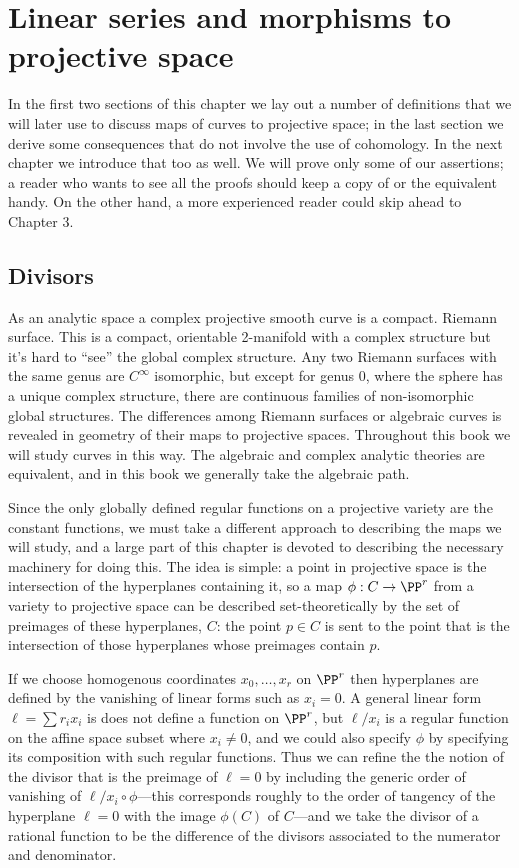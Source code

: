 

\chapter{Linear series and morphisms to projective space}\label{linear series}

In the first two sections of this chapter we lay out a number of definitions that we will later use to discuss
maps of curves to projective space; in the last section we derive some consequences that do not involve the
use of cohomology. In the next chapter we introduce that too as well. We will prove only some of our assertions; a reader who wants to see all the proofs should keep a copy of \cite{Hartshorne1977} or the equivalent handy. On the other hand, a more experienced reader
could skip ahead to Chapter 3.

\section{Divisors}

As an analytic space a complex projective smooth curve is a compact. Riemann surface. This is a compact, orientable 2-manifold with a complex structure but it's hard to ``see'' the global complex structure. Any two Riemann surfaces with the same genus are $C^\infty$ isomorphic, but except for genus 0, where the sphere has a unique complex structure,
there are continuous families of non-isomorphic global structures.  The differences among Riemann surfaces or algebraic curves is revealed in  geometry of their maps to projective spaces. Throughout this book we will study curves in this way. The algebraic and
complex analytic theories are equivalent, and in this book we generally take the algebraic path.

Since the only  globally defined regular functions on a projective variety are the constant functions, we must take a different approach to describing the maps we will study, and a large part of this chapter is devoted to describing the necessary machinery for doing this. The idea is simple: a point in projective space is the intersection of the hyperplanes containing it, so a map $\phi: C\to \PP^r$ from a variety to projective space can be described set-theoretically
by the set of preimages of these hyperplanes, $C$: the point $p\in C$ is sent to the point
that is the intersection of those hyperplanes whose preimages contain $p$. 

If we choose homogenous coordinates $x_0,\dots, x_r$ on $\PP^r$ then hyperplanes
are defined by the vanishing of linear forms such as $x_i=0$. A general linear form
$\ell = \sum r_ix_i$ is does not define a function on $\PP^r$, but $\ell/x_i$ is a regular function on the affine space subset where $x_i\neq 0$, and we could also
 specify $\phi$ by specifying its composition with such regular functions. Thus we can refine the the notion of the divisor that is the preimage of $\ell=0$ by including the generic order of vanishing of $\ell/x_i \circ \phi$---this corresponds roughly to the order of tangency
 of the hyperplane $\ell=0$ with the image $\phi(C)$ of $C$---and we take the divisor of a rational
 function to be the difference of the divisors associated to the numerator and denominator.

